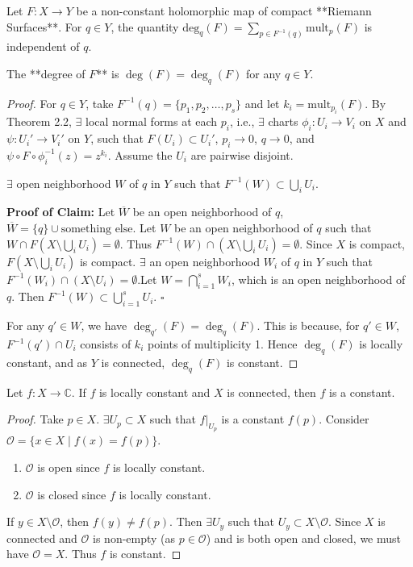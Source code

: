 \documentclass{article}
\begin{document}
\begin{theorem} 
Let $F: X \to Y$ be a non-constant holomorphic map of compact **Riemann Surfaces**.
For $q \in Y$, the quantity $\text{deg}_q(F) = \sum_{p \in F^{-1}(q)} \text{mult}_p(F)$ is independent of $q$.
\end{theorem}

\begin{definition}
The **degree of $F$** is $\deg(F) = \deg_q(F)$ for any $q \in Y$.
\end{definition}

\begin{proof}
For $q \in Y$, take $F^{-1}(q) = \{p_1, p_2, \dots, p_s\}$ and let $k_i = \text{mult}_{p_i}(F)$.
By Theorem 2.2, $\exists$ local normal forms at each $p_i$, i.e.,
$\exists$ charts $\phi_i: U_i \to V_i$ on $X$ and $\psi: U_i' \to V_i'$ on $Y$,
such that $F(U_i) \subset U_i'$, $p_i \to 0$, $q \to 0$,
and $\psi \circ F \circ \phi_i^{-1}(z) = z^{k_i}$. Assume the $U_i$ are pairwise disjoint.
\begin{claim*}
$\exists$ open neighborhood $W$ of $q$ in $Y$ such that $F^{-1}(W) \subset \bigcup_{i} U_i$.
\end{claim*}
\textbf{Proof of Claim:}
Let $\overline{W}$ be an open neighborhood of $q$, $\overline{W} = \{q\} \cup \text{something else}$.
Let $W$ be an open neighborhood of $q$ such that $W \cap F(X \setminus \bigcup_i U_i) = \emptyset$.
Thus $F^{-1}(W) \cap (X \setminus \bigcup_i U_i) = \emptyset$.
Since $X$ is compact, $F(X \setminus \bigcup_i U_i)$ is compact.
$\exists$ an open neighborhood $W_i$ of $q$ in $Y$ such that $F^{-1}(W_i) \cap (X \setminus U_i) = \emptyset$.Let $W = \bigcap_{i=1}^s W_i$, which is an open neighborhood of $q$. Then $F^{-1}(W) \subset \bigcup_{i=1}^s U_i$. $\square$

For any $q' \in W$, we have $\deg_{q'}(F) = \deg_q(F)$.
This is because, for $q' \in W$, $F^{-1}(q') \cap U_i$ consists of $k_i$ points of multiplicity 1.
Hence $\deg_q(F)$ is locally constant, and as $Y$ is connected, $\deg_q(F)$ is constant.
\end{proof}

\begin{remark}
Let $f: X \to \mathbb{C}$. If $f$ is locally constant and $X$ is connected,
then $f$ is a constant.
\end{remark}

\begin{proof}
Take $p \in X$. $\exists U_p \subset X$ such that $f|_{U_p}$ is a constant $f(p)$.
Consider $\mathcal{O} = \{x \in X \mid f(x) = f(p)\}$.
\begin{enumerate}
    \item $\mathcal{O}$ is open since $f$ is locally constant.
    \item $\mathcal{O}$ is closed since $f$ is locally constant.
\end{enumerate}
If $y \in X \setminus \mathcal{O}$, then $f(y) \neq f(p)$. Then $\exists U_y$ such that $U_y \subset X \setminus \mathcal{O}$.
Since $X$ is connected and $\mathcal{O}$ is non-empty (as $p \in \mathcal{O}$) and is both open and closed, we must have $\mathcal{O} = X$.
Thus $f$ is constant.
\end{proof}
\end{document}
